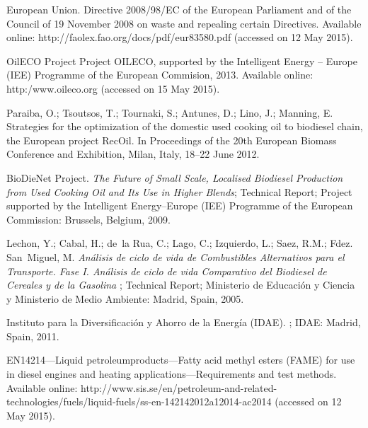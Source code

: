 \documentclass[sustainability,article,accept,moreauthors,pdftex,12pt,a4paper]{mdpi}
\begin{document}
\begin{thebibliography}{----}
{European Union}.
\newblock Directive 2008/98/EC of the European Parliament and of the Council of 19 November 2008 on waste and repealing certain Directives. Available online: http://faolex.fao.org/docs/pdf/eur83580.pdf (accessed on 12 May 2015).

{OilECO Project}
\newblock Project OILECO, supported by the Intelligent Energy -- Europe (IEE) Programme of the European Commision, 2013. Available online: http:/www.oileco.org (accessed on 15 \linebreak May 2015).
 
Paraiba, O.; Tsoutsos, T.; Tournaki, S.; Antunes, D.; Lino, J.; Manning, E.
\newblock Strategies for the optimization of the domestic used cooking oil to
 biodiesel chain, the European project RecOil.
\newblock In Proceedings of the 20th European Biomass Conference and Exhibition, Milan, Italy, 18--22 June 2012. 

{BioDieNet Project}.
\newblock \textit{The Future of Small Scale, Localised Biodiesel Production from Used
Cooking Oil and Its Use in Higher Blends};
\newblock Technical Report; Project supported by the Intelligent Energy--Europe (IEE) Programme of the European Commission: Brussels, Belgium, 2009.

Lechon, Y.; Cabal, H.; de~la Rua, C.; Lago, C.; Izquierdo, L.; Saez, R.M.; Fdez. San~Miguel, M.
\newblock \textit{An\'alisis de ciclo de vida de Combustibles Alternativos para el Transporte. Fase I. An\'alisis de ciclo de vida Comparativo del Biodiesel de Cereales y de la Gasolina
};
\newblock Technical Report; Ministerio de Educaci\'on y Ciencia y Ministerio de Medio Ambiente: Madrid, Spain, 2005.

Instituto para la Diversificaci\'on y Ahorro de la Energ\'ia (IDAE).
; IDAE: Madrid, Spain, 2011.

EN14214---Liquid petroleumproducts---Fatty acid methyl esters (FAME) for use in diesel engines and heating applications---Requirements and test methods.
\newblock Available online: http://www.sis.se/en/\linebreak petroleum-and-related-technologies/fuels/liquid-fuels/ss-en-142142012a12014-ac2014 (accessed on 12 May 2015).


\end{thebibliography}
\end{document}
